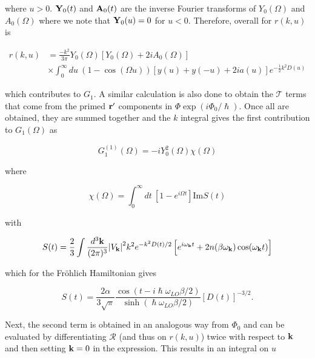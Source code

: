 where $u > 0$. $\vb{Y}_0(t)$ and $\vb{A}_0(t)$ are the inverse Fourier transforms of $Y_0(\Omega)$ and $A_0(\Omega)$ where we note that $\vb{Y}_0(u) = 0$ for $u < 0$. Therefore, overall for $r(k, u)$ is 

\begin{equation}
    \begin{aligned}
        r(k, u) &= \frac{-k^2}{3\pi} Y_0(\Omega) \left[ Y_0(\Omega) + 2i A_0(\Omega) \right] \\
        &\times \int^\infty_0 du\ (1 - \cos(\Omega u)) \left[ y(u) + y(-u) + 2ia(u) \right] e^{-\frac{1}{2}k^2D(u)}
    \end{aligned}
\end{equation}

which contributes to $G_1$. A similar calculation is also done to obtain the $\mathcal{T}$ terms that come from the primed $\vb{r'}$ components in $\Phi \exp(i \Phi_0 / \hslash)$. Once all are obtained, they are summed together and the $k$ integral gives the first contribution to $G_1(\Omega)$ as

\begin{equation}
    G^{(1)}_1(\Omega) = -iY_0^2(\Omega) \chi(\Omega)
\end{equation}

where

\begin{equation}\label{eqn:fhip_chi}
    \chi(\Omega) = \int_0^\infty dt\ \left[ 1 - e^{i \Omega t} \right] \text{Im} S(t)
\end{equation}

with

\begin{equation}\label{eqn:S}
    \begin{aligned}
        S(t) = \frac{2}{3} \int \frac{d^3\vb{k}}{(2\pi)^3} \abs{V_{\vb{k}}}^2 k^2 e^{-k^2 D(t) / 2} \left[ e^{i\omega_{\vb{k}}t} + 2n(\beta\omega_{\vb{k}}) \cos(\omega_{\vb{k}}t) \right]
    \end{aligned}
\end{equation}

which for the Fr\"ohlich Hamiltonian gives

\begin{equation}\label{eqn:dynamic_structure}
    S(t) =  \frac{2\alpha}{3\sqrt{\pi}} \frac{\cos\left(t - i\hslash\omega_{LO}\beta/2\right)}{\sinh\left(\hslash\omega_{LO} \beta / 2 \right)} \left[D(t)\right]^{-3/2}.
\end{equation}

Next, the second term is obtained in an analogous way from $\Phi_0$ and can be evaluated by differentiating $\mathcal{R}$ (and thus on $r(k, u)$) twice with respect to $\vb{k}$ and then setting $\vb{k} = 0$ in the expression. This results in an integral on $u$

